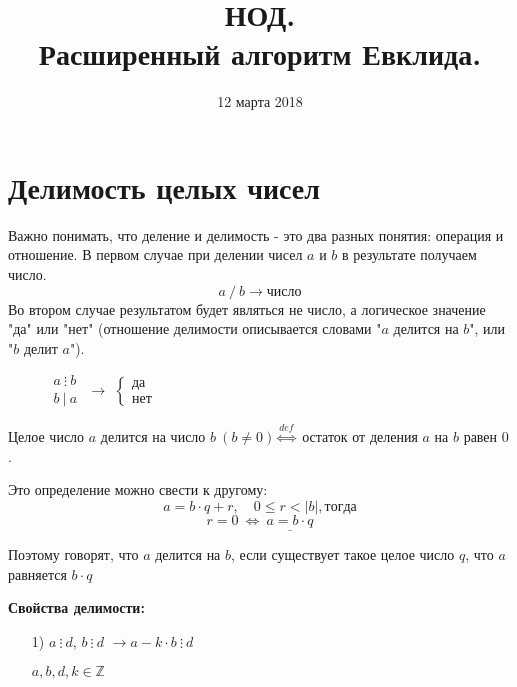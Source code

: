 \documentclass[russian]{lecture-notes}
\title{НОД. \\Расширенный алгоритм Евклида.}
\date{12 марта 2018}
\begin{document}
\maketitle

\section{Делимость целых чисел}

Важно понимать, что деление и делимость - это два разных понятия: операция и отношение. В первом случае при делении чисел $a$ и $b$ в результате получаем число.
\[a \ / \ b \longrightarrow  \text{число}\]
Во втором случае результатом будет являться не число, а логическое значение "да" или "нет" (отношение делимости описывается словами "$a$ делится на $b$", или "$b$ делит $a$").
\begin{figure}[h!]
    \centering
    $
    \begin{matrix}
        a \ \vdots \ b
        \\
        b \ | \ a
    \end{matrix}
    $
    $\longrightarrow$
    $
    \begin{cases}
        \text{да} \\
        \text{нет}
    \end{cases}
    $
\end{figure}


\begin{definition}
    Целое число $a$ делится на число $b \ (b  \neq 0) \stackrel{def}{\Longleftrightarrow}$ остаток от деления $a$ на $b$ равен $0$.
\end{definition}

Это определение можно свести к другому:
\[a = b \cdot q + r, \quad
0 \leq r < |b|, тогда\]
\[r = 0 \ \Leftrightarrow \ \underline{a = b \cdot q}\]

Поэтому говорят, что $a$ делится на $b$, если существует такое целое число $q$, что $a$ равняется $b \cdot q$

\textbf{Свойства делимости:}
\begin{itemize}
    \item [1)] $a \ \vdots \ d$, $b \ \vdots \ d$ $\rightarrow a - k \cdot b \ \vdots\ d$

    \begin{note}
        $a,b,d,k \in \mathbb{Z}$
    \end{note}
    \label{sv:1}
\end{itemize}
\end{document}
